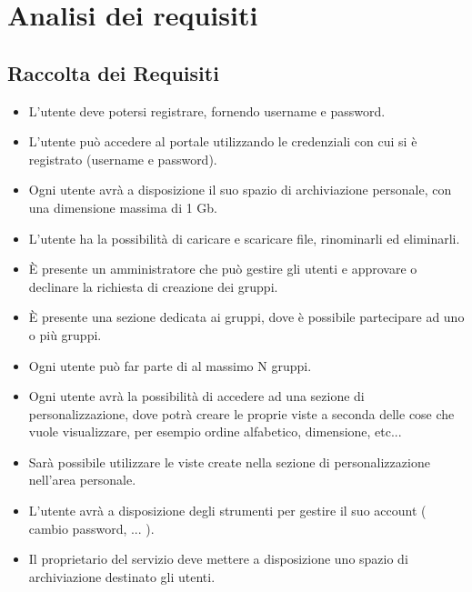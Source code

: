 \chapter*{Analisi dei requisiti}

\section*{Raccolta dei Requisiti}

\begin{itemize}

  \item L'utente deve potersi registrare, fornendo username e password.
  
  \item L'utente può accedere al portale utilizzando le credenziali con cui si è registrato (username e password).
  
  \item Ogni utente avrà a disposizione il suo spazio di archiviazione personale, con una dimensione massima di 1 Gb.
  
  \item L'utente ha la possibilità di caricare e scaricare file, rinominarli ed eliminarli.
  
  \item È presente un amministratore che può gestire gli utenti e approvare o declinare la richiesta di creazione dei gruppi.
  
  \item È presente una sezione dedicata ai gruppi, dove è possibile partecipare ad uno o più gruppi.
  
  \item Ogni utente può far parte di al massimo N gruppi.
  
  \item Ogni utente avrà la possibilità di accedere ad una sezione di
  personalizzazione, dove potrà creare le proprie viste a seconda delle cose che vuole visualizzare, per esempio ordine alfabetico, dimensione, etc...
  
  \item Sarà possibile utilizzare le viste create nella sezione di personalizzazione nell'area personale.
  
  \item L'utente avrà a disposizione degli strumenti per gestire il suo account ( cambio password, ... ).
  
  \item Il proprietario del servizio deve mettere a disposizione uno spazio di archiviazione destinato gli utenti.
  
\end{itemize}

